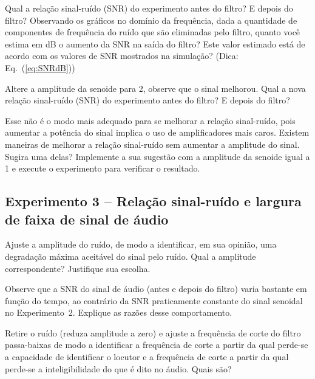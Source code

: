 \documentclass[12pt,addpoints]{exam}
\begin{document}
\begin{questions}
    \question Qual a relação sinal-ruído (SNR) do experimento antes do filtro? E depois do filtro? Observando os gráficos no domínio da frequência, dada a quantidade de componentes de frequência do ruído que são eliminadas pelo filtro, quanto você estima em dB o aumento da SNR na saída do filtro? Este valor estimado está de acordo com os valores de SNR mostrados na simulação? (Dica: Eq.~(\ref{eq:SNRdB}))
    \fillwithlines{0.75in}
    
    \question Altere a amplitude da senoide para 2, observe que o sinal melhorou. Qual a nova relação sinal-ruído (SNR) do experimento antes do filtro? E depois do filtro?
    \fillwithlines{0.5in}
    
    \question Esse não é o modo mais adequado para se melhorar a relação sinal-ruído, pois aumentar a potência do sinal implica o uso de amplificadores mais caros. Existem maneiras de melhorar a relação sinal-ruído sem aumentar a amplitude do sinal. Sugira uma delas? Implemente a sua sugestão com a amplitude da senoide igual a 1 e execute o experimento para verificar o resultado.
    \fillwithlines{0.5in}
\end{questions}

\subsection*{Experimento 3 -- Relação sinal-ruído e largura de faixa de sinal de áudio}

\begin{questions}
    \question Ajuste a amplitude do ruído, de modo a identificar, em sua opinião, uma degradação máxima aceitável do sinal pelo ruído. Qual a amplitude correspondente? Justifique sua escolha.
    \fillwithlines{0.75in}
    
    \question Observe que a SNR do sinal de áudio (antes e depois do filtro) varia bastante em função do tempo, ao contrário da SNR praticamente constante do sinal senoidal no Experimento~2. Explique as razões desse comportamento.
    \fillwithlines{0.75in}
    
    \question Retire o ruído (reduza amplitude a zero) e ajuste a frequência de corte do filtro passa-baixas de modo a identificar a frequência de corte a partir da qual perde-se a capacidade de identificar o locutor e a frequência de corte a partir da qual perde-se a inteligibilidade do que é dito no áudio. Quais são?
    \fillwithlines{0.5in}
\end{questions}
\end{document}
